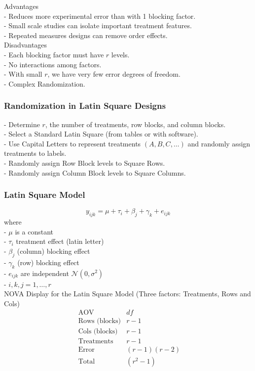 \documentclass[11pt,a4paper]{article}
\begin{document}
Advantages\\
- Reduces more experimental error than with 1 blocking factor.\\
- Small scale studies can isolate important treatment features.\\
- Repeated measures designs can remove order effects.\\

Disadvantages\\
- Each blocking factor must have $r$ levels.\\
- No interactions among factors.\\
- With small $r$, we have very few error degrees of freedom.\\
- Complex Randomization.\\

\subsubsection{ Randomization in Latin Square Designs}
- Determine $r$, the number of treatments, row blocks, and column blocks.\\
- Select a Standard Latin Square (from tables or with software).\\
- Use Capital Letters to represent treatments $(A, B, C, \ldots)$ and randomly assign treatments to labels.\\
- Randomly assign Row Block levels to Square Rows.\\
- Randomly assign Column Block levels to Square Columns.\\

\subsubsection{ Latin Square Model}
$$
y_{i j k}=\mu+\tau_{i}+\beta_{j}+\gamma_{k}+e_{i j k}
$$
where\\
- $\mu$ is a constant\\
- $\tau_{i}$ treatment effect (latin letter)\\
- $\beta_{j}$ (column) blocking effect\\
- $\gamma_{k}$ (row) blocking effect\\
- $e_{i j k}$ are independent $\mathcal{N}\left(0, \sigma^{2}\right)$\\
- $i, k, j=1, \ldots, r$\\

NOVA Display for the Latin Square Model (Three factors: Treatments, Rows and Cols)
$$\begin{array}{lcc}\text { AOV } & d f  \\ \text { Rows (blocks)} & r-1  \\ \text { Cols (blocks)} & r-1  \\ \text { Treatments } & r-1  \\ \text { Error } & (r-1)(r-2)  \\ \text { Total } & \left(r^{2}-1\right)\end{array}$$
\end{document}
